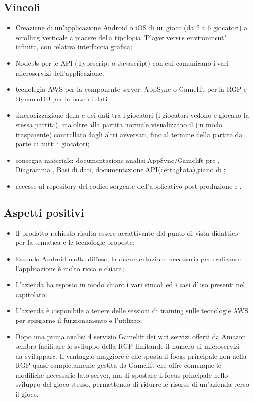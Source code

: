 \subsection{Vincoli}
\begin{itemize}
\item Creazione di un'applicazione Android o iOS di un gioco (da 2 a 6 giocatori) a scrolling verticale a piacere della tipologia "Player versus environment" infinito, con relativa interfaccia grafica;
\item Node.Js per le API (Typescript o Javascript) con cui comunicano i vari microservizi dell'applicazione;
\item tecnologia AWS per la componente server: AppSync o Gamelift per la RGP e DynamoDB per la base di dati;    
\item sincronizzazione della e dei dati tra i giocatori (i giocatori vedono e giocano la stessa partita), ma oltre alla partita normale visualizzano il  (in modo trasparente) controllato dagli altri avversari, fino al termine della partita da parte di tutti i giocatori;
\item consegna materiale: documentazione analisi AppSync/Gamelift pre , Diagramma  , Basi di dati, documentazione API(dettagliata),piano di ;
\item accesso al repository del codice sorgente dell'applicativo post produzione e  .
\end{itemize}

\subsection{Aspetti positivi}
\begin{itemize}
\item Il prodotto richiesto risulta essere accattivante dal punto di vista didattico per la tematica e le tecnologie proposte;
\item Essendo Android molto diffuso, la documentazione necessaria per realizzare l'applicazione è molto ricca e chiara;
\item L'azienda ha esposto in modo chiaro i vari vincoli ed i casi d'uso presenti nel capitolato;
\item L'azienda \`e disponibile a tenere delle sessioni di training sulle tecnologie AWS per spiegarne il funzionamento e l'utilizzo;
\item Dopo una prima analisi il servizio Gamelift dei vari servizi offerti da Amazon sembra facilitare lo sviluppo della RGP limitando il numero di microservizi da sviluppare. Il vantaggio maggiore è che sposta il focus principale non nella RGP quasi completamente gestita da Gamelift che offre comunque le modifiche necessarie lato server, ma di spostare il focus principale nello sviluppo del gioco stesso, permettendo di ridurre le risorse  di un’azienda verso il gioco.
\end{itemize}
